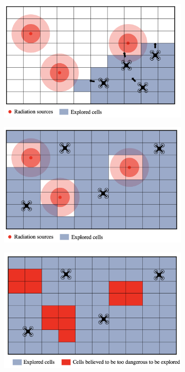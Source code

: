 \label{annexe: intuition}
\begin{figure}[h]
    \centering
    \begin{subfigure}{0.48\textwidth}
         \centering
         \includegraphics[width=\textwidth]{images/risk_aware_b.png}
         \caption{}
         \label{risk_aware_b}
    \end{subfigure}
    \hfill
    \begin{subfigure}{0.48\textwidth}
         \centering
         \includegraphics[width=\textwidth]{images/risk_aware_c.png}
         \caption{}
         \label{risk_aware_c}
    \end{subfigure}
    \hfill
    \begin{subfigure}{0.48\textwidth}
         \centering
         \includegraphics[width=\textwidth]{images/risk_aware_d.png}

\end{subfigure}
\end{figure}
